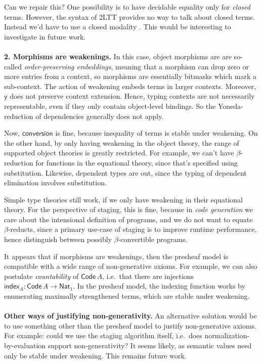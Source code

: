 \documentclass[11pt,a4paper,twoside]{article}
\newcommand{\msf}[1]{\mathsf{#1}}
\newcommand{\Code}{\mathsf{Code}}
\begin{document}
Can we repair this? One possibility is to have decidable equality only for
\emph{closed} terms. However, the syntax of 2LTT provides no way to talk about
closed terms. Instead we'd have to use a closed modality
\cite{bocquet2021induction}. This would be interesting to investigate in future
work.
\\\\
\textbf{2. Morphisms are weakenings.} In this case, object morphisms are are
so-called \emph{order-preserving embeddings}, meaning that a morphism can drop
zero or more entries from a context, so morphisms are essentially bitmasks which
mark a sub-context. The action of weakening embeds terms in larger
contexts. Moreover, $\msf{y}$ does not preserve context extension. Hence,
typing contexts are not necessarily representable, even if they only contain object-level
bindings. So the Yoneda-reduction of dependencies generally does not apply.

Now, $\msf{conversion}$ is fine, because inequality of terms is stable under
weakening. On the other hand, by only having weakening in the object theory, the
range of supported object theories is greatly restricted. For example, we can't
have $\beta$-reduction for functions in the equational theory, since that's
specified using substitution. Likewise, dependent types are out, since the
typing of dependent elimination involves substitution.

Simple type theories still work, if we only have weakening in their equational
theory. For the perspective of staging, this is fine, because in \emph{code
generation} we care about the intensional definition of programs, and we do not
want to equate $\beta$-reducts, since a primary use-case of staging is to
improve runtime performance, hence distinguish between possibly
$\beta$-convertible programs.

It appears that if morphisms are weakenings, then the presheaf model is
compatible with a wide range of non-generative axioms. For example, we can also
postulate \emph{countability} of $\Code\,A$, i.e.\ that there are injections
$\msf{index}_A : \Code\,A \to \msf{Nat}_1$. In the presheaf model, the indexing function
works by enumerating maximally strengthened terms, which are stable under
weakening.
\\\\
\textbf{Other ways of justifying non-generativity.} An alternative solution
would be to use something other than the presheaf model to justify
non-generative axioms. For example: could we use the staging algorithm itself,
i.e.\ does normalization-by-evaluation support non-generativity? It seems
likely, as semantic values need only be stable under weakening. This remains
future work.
\end{document}
